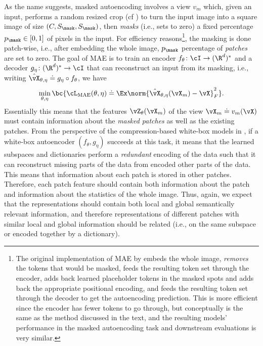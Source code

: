 \documentclass[../../book-main.tex]{subfiles}
\begin{document}
As the name suggests, masked autoencoding involves a view \(v_{m}\)
which, given an input, performs a random resized crop (cf
) to turn the input image
into a square image of size \((C, S_{\mask}, S_{\mask})\), then
\textit{masks} (i.e., sets to zero) a fixed percentage \(p_{\mask}
\in [0, 1]\) of pixels in the input. For efficiency
reasons\footnote{The original implementation of MAE by
\citet{he2022masked} embeds the whole image, \textit{removes} the
tokens that would be masked, feeds the resulting token set through
the encoder, adds back learned placeholder tokens in the masked spots
and adds back the appropriate positional encoding, and feeds the
resulting token set through the decoder to get the autoencoding
prediction. This is more efficient since the encoder has fewer tokens
to go through, but conceptually is the same as the method discussed
in the text, and the resulting models' performance in the masked
autoencoding task and downstream evaluations is very similar.}, the
masking is done patch-wise, i.e., after embedding the whole image,
\(p_{\mask}\) percentage of \textit{patches} are set to zero. The
goal of MAE is to train an encoder \(f_{\theta} \colon \cI \to
(\R^{d})^{*}\) and a decoder \(g_{\eta} \colon (\R^{d})^{*} \to \cI\)
that can reconstruct an input from its masking, i.e., writing
\(\hat{\vX}_{\theta, \eta} \doteq g_{\eta} \circ f_{\theta}\), we have
\begin{equation}
\min_{\theta, \eta}\bc{\cL_{\mathrm{MAE}}(\theta, \eta) \doteq
\Ex\norm{\hat{\vX}_{\theta, \eta}(\vX_{m}) - \vX}_{F}^{2}} .
\end{equation}
Essentially this means that the features \(\vZ_{\theta}(\vX_{m})\) of
the view \(\vX_{m} \doteq v_{m}(\vX)\) must contain information about
the \textit{masked patches} as well as the existing patches. From the
perspective of the compression-based white-box models in
, if a white-box autoencoder \((f_{\theta},
g_{\eta})\) succeeds at this task, it means that the learned
subspaces and dictionaries perform a \textit{redundant} encoding of
the data such that it can reconstruct missing parts of the data from
encoded other parts of the data. This means that information about
each patch is stored in other patches. Therefore, each patch feature
should contain both information about the patch and information about
the statistics of the whole image. Thus, again, we expect that the
representations should contain both local and global semantically
relevant information, and therefore representations of different
patches with similar local and global information should be related
(i.e., on the same subspace or encoded together by a dictionary).
\end{document}
